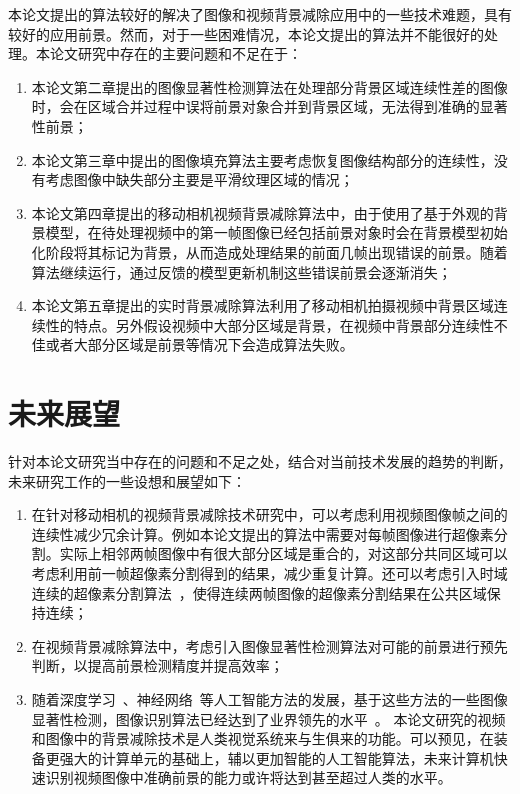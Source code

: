 本论文提出的算法较好的解决了图像和视频背景减除应用中的一些技术难题，具有较好的应用前景。然而，对于一些困难情况，本论文提出的算法并不能很好的处理。本论文研究中存在的主要问题和不足在于：
\begin{enumerate}
  \item 本论文第二章提出的图像显著性检测算法在处理部分背景区域连续性差的图像时，会在区域合并过程中误将前景对象合并到背景区域，无法得到准确的显著性前景；
  \item 本论文第三章中提出的图像填充算法主要考虑恢复图像结构部分的连续性，没有考虑图像中缺失部分主要是平滑纹理区域的情况；
  \item 本论文第四章提出的移动相机视频背景减除算法中，由于使用了基于外观的背景模型，在待处理视频中的第一帧图像已经包括前景对象时会在背景模型初始化阶段将其标记为背景，从而造成处理结果的前面几帧出现错误的前景。随着算法继续运行，通过反馈的模型更新机制这些错误前景会逐渐消失；

  \item 本论文第五章提出的实时背景减除算法利用了移动相机拍摄视频中背景区域连续性的特点。另外假设视频中大部分区域是背景，在视频中背景部分连续性不佳或者大部分区域是前景等情况下会造成算法失败。

\end{enumerate}
\section{未来展望}
\label{ch6:sec:futureWorks}
针对本论文研究当中存在的问题和不足之处，结合对当前技术发展的趋势的判断，未来研究工作的一些设想和展望如下：
\begin{enumerate}
  \item 在针对移动相机的视频背景减除技术研究中，可以考虑利用视频图像帧之间的连续性减少冗余计算。例如本论文提出的算法中需要对每帧图像进行超像素分割。实际上相邻两帧图像中有很大部分区域是重合的，对这部分共同区域可以考虑利用前一帧超像素分割得到的结果，减少重复计算。还可以考虑引入时域连续的超像素分割算法~\cite{tsp}，使得连续两帧图像的超像素分割结果在公共区域保持连续；
  \item 在视频背景减除算法中，考虑引入图像显著性检测算法对可能的前景进行预先判断，以提高前景检测精度并提高效率；
  \item 随着深度学习~\cite{DeepLearning}、神经网络~\cite{nerualNetworks}等人工智能方法的发展，基于这些方法的一些图像显著性检测，图像识别算法已经达到了业界领先的水平~\cite{NIPS2014_5547,DISC,ImageNet}。 本论文研究的视频和图像中的背景减除技术是人类视觉系统来与生俱来的功能。可以预见，在装备更强大的计算单元的基础上，辅以更加智能的人工智能算法，未来计算机快速识别视频图像中准确前景的能力或许将达到甚至超过人类的水平。
\end{enumerate}
 
 